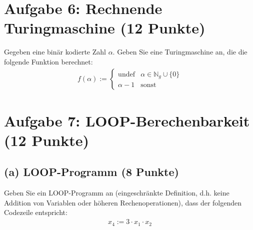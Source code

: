 \documentclass{scrartcl}
\begin{document}
\section*{Aufgabe 6: Rechnende Turingmaschine \hfill (12 Punkte)}
Gegeben eine binär kodierte Zahl $\alpha$. Geben Sie eine Turingmaschine an,
die die folgende Funktion berechnet:
\begin{align*}
   f(\alpha):=\begin{cases}
      \text{undef} & \alpha \in \mathbb{N}_g \cup \{0\} \\
      \alpha - 1 & \text{sonst}
   \end{cases}
\end{align*}

\noindent{}

\pagebreak
\section*{Aufgabe 7: LOOP-Berechenbarkeit \hfill (12 Punkte)}
\subsection*{(a) LOOP-Programm \hfill \normalfont (8 Punkte)}
Geben Sie ein LOOP-Programm an (eingeschränkte Definition, d.h. keine Addition
von Variablen oder höheren Rechenoperationen), dass der folgenden Codezeile
entspricht:
\begin{align*}
   x_4 := 3 \cdot x_1 \cdot x_2
\end{align*}
\end{document}

